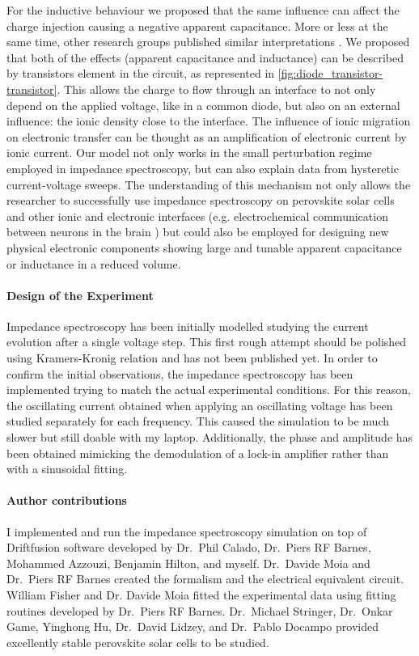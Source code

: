 For the inductive behaviour we proposed that the same influence can affect the charge injection causing a negative apparent capacitance.
More or less at the same time, other research groups published similar interpretations \cite{Ebadi2019,Jacobs2018}.
We proposed that both of the effects (apparent capacitance and inductance) can be described by transistors element in the circuit, as represented in \cref{fig:diode_transistor-transistor}.
This allows the charge to flow through an interface to not only depend on the applied voltage, like in a common diode, but also on an external influence: the ionic density close to the interface.
The influence of ionic migration on electronic transfer can be thought as an amplification of electronic current by ionic current.
Our model not only works in the small perturbation regime employed in impedance spectroscopy, but can also explain data from hysteretic current\hyp{}voltage sweeps.
The understanding of this mechanism not only allows the researcher to successfully use impedance spectroscopy on perovskite solar cells and other ionic and electronic interfaces (e.g. electrochemical communication between neurons in the brain \cite{Cole1956}) but could also be employed for designing new physical electronic components showing large and tunable apparent capacitance or inductance in a reduced volume.

\paragraph{Design of the Experiment}
Impedance spectroscopy has been initially modelled studying the current evolution after a single voltage step.
This first rough attempt should be polished using Kramers\hyp{}Kronig relation and has not been published yet.
In order to confirm the initial observations, the impedance spectroscopy has been implemented trying to match the actual experimental conditions.
For this reason, the oscillating current obtained when applying an oscillating voltage has been studied separately for each frequency.
This caused the simulation to be much slower but still doable with my laptop.
Additionally, the phase and amplitude has been obtained mimicking the demodulation of a lock-in amplifier rather than with a sinusoidal fitting.

\paragraph{Author contributions}
I implemented and run the impedance spectroscopy simulation on top of Driftfusion software developed by Dr.\ Phil Calado, Dr.\ Piers RF Barnes, Mohammed Azzouzi, Benjamin Hilton, and myself.
Dr.\ Davide Moia and Dr.\ Piers RF Barnes created the formalism and the electrical equivalent circuit.
William Fisher and Dr. Davide Moia fitted the experimental data using fitting routines developed by Dr.\ Piers RF Barnes.
Dr.\ Michael Stringer, Dr.\ Onkar Game, Yinghong Hu, Dr.\ David Lidzey, and Dr.\ Pablo Docampo provided excellently stable perovskite solar cells to be studied.

